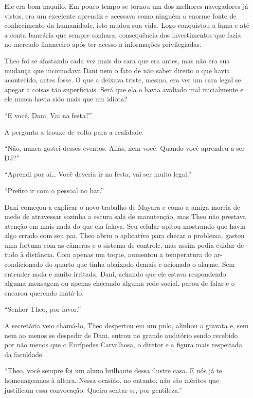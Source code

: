 Ele era bom naquilo. Em pouco tempo se tornou um dos melhores
navegadores já vistos, era um excelente aprendiz e acessava como ninguém
a enorme fonte de conhecimento da humanidade, isto mudou sua vida. Logo
conquistou a fama e até a conta bancária que sempre sonhara,
consequência dos investimentos que fazia no mercado financeiro após ter
acesso a informações privilegiadas.

Theo foi se afastando cada vez mais do cara que era antes, mas não era
sua mudança que incomodava Dani nem o fato de não saber direito o que
havia acontecido, antes fosse. O que a deixava triste, mesmo, era ver um
cara legal se apegar a coisas tão superficiais. Será que ela o havia
avaliado mal inicialmente e ele nunca havia sido mais que um idiota?

``E você, Dani. Vai na festa?''

A pergunta a trouxe de volta para a realidade.

``Não, nunca gostei desses eventos. Aliás, nem você. Quando você
aprendeu a ser DJ?''

``Aprendi por aí\ldots{} Você deveria ir na festa, vai ser muito
legal.''

``Prefiro ir com o pessoal no bar.''

Dani começou a explicar o novo trabalho de Mayara e como a amiga morria
de medo de atravessar sozinha a escura sala de manutenção, mas Theo não
prestava atenção em mais nada do que ela falava. Seu celular apitou
mostrando que havia algo errado com seu pai, Theo abriu o aplicativo
para checar o problema, gastou uma fortuna com as câmeras e o sistema de
controle, mas assim podia cuidar de tudo à distância. Com apenas um
toque, aumentou a temperatura do ar-condicionado do quarto que tinha
abaixado demais e acionado o alarme. Sem entender nada e muito irritada,
Dani, achando que ele estava respondendo alguma mensagem ou apenas
checando alguma rede social, parou de falar e o encarou querendo
matá-lo.

``Senhor Theo, por favor.''

A secretária veio chamá-lo, Theo despertou em um pulo, alinhou a gravata
e, sem nem ao menos se despedir de Dani, entrou no grande auditório
sendo recebido por não menos que o Eurípedes Carvalhosa, o diretor e a
figura mais respeitada da faculdade.

``Theo, você sempre foi um aluno brilhante dessa ilustre casa. E nós já
te homenageamos à altura. Nessa ocasião, no entanto, não são méritos que
justificam essa convocação. Queira sentar-se, por gentileza.''

